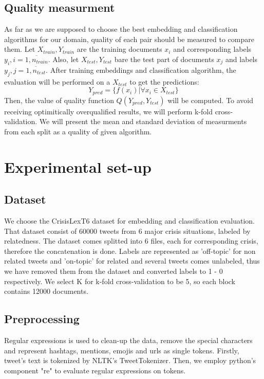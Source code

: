 \documentclass[unicode, 12pt, a4paper,oneside]{article}
\begin{document}
	\subsection{Quality measurment}
	As far as we are supposed to choose the best embedding and classification algorithms for our domain, quality of each pair should be measured to compare them. Let $X_{train}, Y_{train}$ are the training documents $x_i$ and corresponding labels $y_i, i  = \overline{1, n_{train}}$. Also, let $X_{test}, Y_{test}$ bare the test part of documents $x_j$ and labels $y_j, j = \overline{1, n_{test}}$. After training embeddings and classification algorithm, the evaluation will be performed on a $X_{test}$ to get the predictions: $$Y_{pred} = \{ f(x_i) | \forall x_i \in X_{test}\}$$ Then, the value of quality function $Q(Y_{pred}, Y_{test})$ will be computed. To avoid receiving optimitically overqualified results, we will perform k-fold cross-validation. We will present the mean and standard deviation of measurments from each split as a quality of given algorithm.

	\section{Experimental set-up}

	\subsection{Dataset}

	We choose the CrisisLexT6 dataset for embedding and classification evaluation. That dataset consist of 60000 tweets from 6 major crisis situations, labeled by relatedness. The dataset comes splitted into 6 files, each for corresponding crisis, therefore the concatenation is done. Labels are represented as 'off-topic' for non related tweets and 'on-topic' for related and several tweets comes unlabeled, thus we have removed them from the dataset and converted labels to 1 - 0 respectively. We select K for k-fold cross-validation to be 5, so each block contains 12000 documents. 

	\subsection{Preprocessing}

	Regular expressions is used to clean-up the data, remove the special characters and represent hashtags, mentions, emojis and urls as single tokens. Firstly, tweet's text is tokenized by NLTK's\cite{nltk} TweetTokenizer. Then, we employ python's component "re"  to evaluate regular expressions on tokens. 
\end{document}
